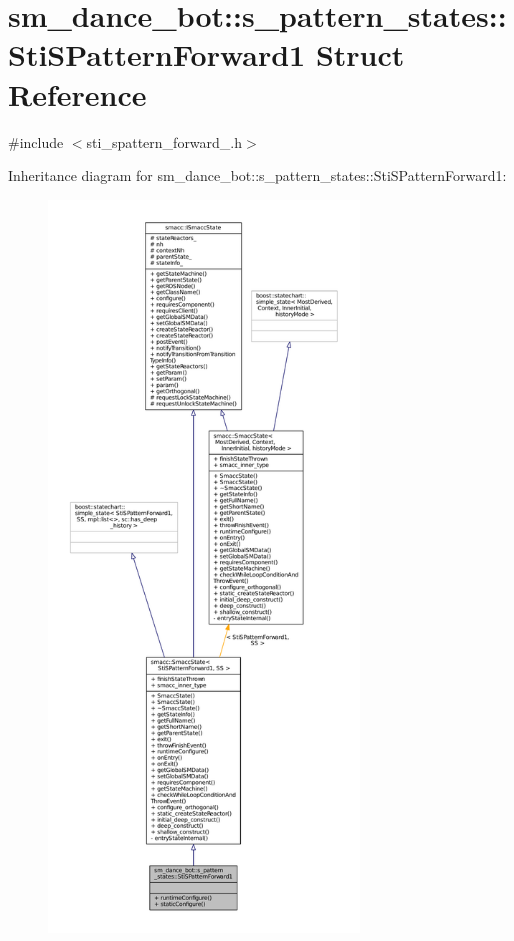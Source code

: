 \hypertarget{structsm__dance__bot_1_1s__pattern__states_1_1StiSPatternForward1}{}\section{sm\+\_\+dance\+\_\+bot\+:\+:s\+\_\+pattern\+\_\+states\+:\+:Sti\+S\+Pattern\+Forward1 Struct Reference}
\label{structsm__dance__bot_1_1s__pattern__states_1_1StiSPatternForward1}


{\ttfamily \#include $<$sti\+\_\+spattern\+\_\+forward\+\_.\+h$>$}



Inheritance diagram for sm\+\_\+dance\+\_\+bot\+:\+:s\+\_\+pattern\+\_\+states\+:\+:Sti\+S\+Pattern\+Forward1\+:
\nopagebreak
\begin{figure}[H]
\begin{center}
\leavevmode
\includegraphics[height=550pt]{structsm__dance__bot_1_1s__pattern__states_1_1StiSPatternForward1__inherit__graph}
\end{center}
\end{figure}


